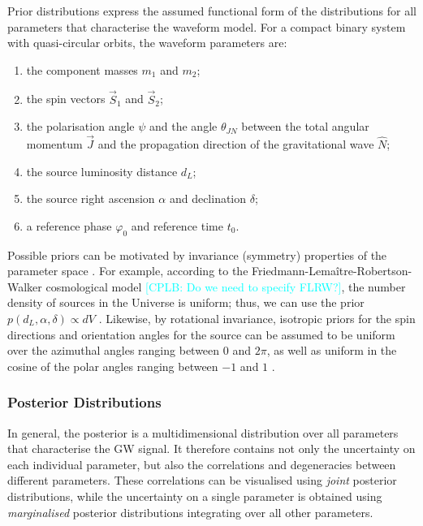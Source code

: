 \documentclass[a4paper,12pt]{article}
\newcommand{\cplb}[1]{\textcolor{cyan}{[CPLB: #1]}}
\begin{document}
Prior distributions express the assumed functional form of the distributions for all parameters that characterise the waveform model. For a compact binary system with quasi-circular orbits, the waveform parameters are:
\begin{enumerate}
    \item the component masses $m_1$ and $m_2$;
    \item the spin vectors $\Vec{S}_{1}$ and $\Vec{S}_{2}$;
    \item the polarisation angle $\psi$ and the angle $\theta_{JN}$ between the total angular momentum $\Vec{J}$ and the propagation direction of the gravitational wave $\hat{N}$;
    \item the source luminosity distance $d_{L}$;
    \item the source right ascension $\alpha$ and declination $\delta$;
    \item a reference phase $\varphi_{0}$ and reference time $t_{0}$.
\end{enumerate}
Possible priors can be motivated by invariance (symmetry) properties of the parameter space \cite{lindstrom2017spaces}. For example, according to the Friedmann-Lema\^itre-Robertson-Walker cosmological model \cplb{Do we need to specify FLRW?}, the number density of sources in the Universe is uniform; thus, we can use the prior $p(d_{L},\alpha, \delta) \propto dV$ \cite{abbott2020guide}. 
Likewise, by rotational invariance, isotropic priors for the spin directions and orientation angles for the source can be assumed to be uniform over the azimuthal angles ranging between $0$ and $2\pi$, as well as uniform in the cosine of the polar angles ranging between $-1$ and $1$ \cite{abbott2020guide}.

\subsubsection{Posterior Distributions}
\label{subsec:postdist}

In general, the posterior is a multidimensional distribution over all parameters that characterise the GW signal. It therefore contains not only the uncertainty on each individual parameter, but also the correlations and degeneracies between different parameters. These correlations can be visualised using \textit{joint} posterior distributions, while the uncertainty on a single parameter is obtained using \textit{marginalised} posterior distributions integrating over all other parameters. 
\end{document}
